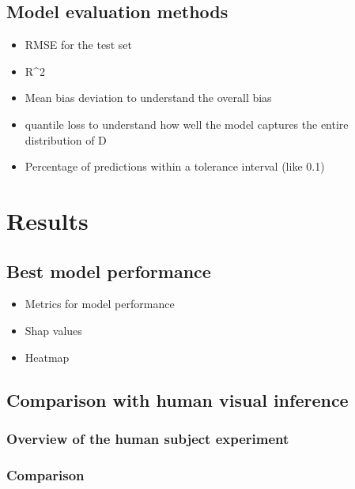 \documentclass[]{interact}
\theoremstyle{plain}%
\theoremstyle{definition}
\theoremstyle{remark}
\providecommand{\tightlist}{%
  \setlength{\itemsep}{0pt}\setlength{\parskip}{0pt}}
\def\tightlist{}
\begin{document}
\hypertarget{model-evaluation-methods}{%
\subsection{Model evaluation methods}\label{model-evaluation-methods}}

\begin{itemize}
\tightlist
\item
  RMSE for the test set
\item
  R\^{}2
\item
  Mean bias deviation to understand the overall bias
\item
  quantile loss to understand how well the model captures the entire
  distribution of D
\item
  Percentage of predictions within a tolerance interval (like 0.1)
\end{itemize}

\hypertarget{results}{%
\section{Results}\label{results}}

\hypertarget{best-model-performance}{%
\subsection{Best model performance}\label{best-model-performance}}

\begin{itemize}
\tightlist
\item
  Metrics for model performance
\item
  Shap values
\item
  Heatmap
\end{itemize}

\hypertarget{comparison-with-human-visual-inference}{%
\subsection{Comparison with human visual
inference}\label{comparison-with-human-visual-inference}}

\hypertarget{overview-of-the-human-subject-experiment}{%
\subsubsection{Overview of the human subject
experiment}\label{overview-of-the-human-subject-experiment}}

\hypertarget{comparison}{%
\subsubsection{Comparison}\label{comparison}}
\end{document}
